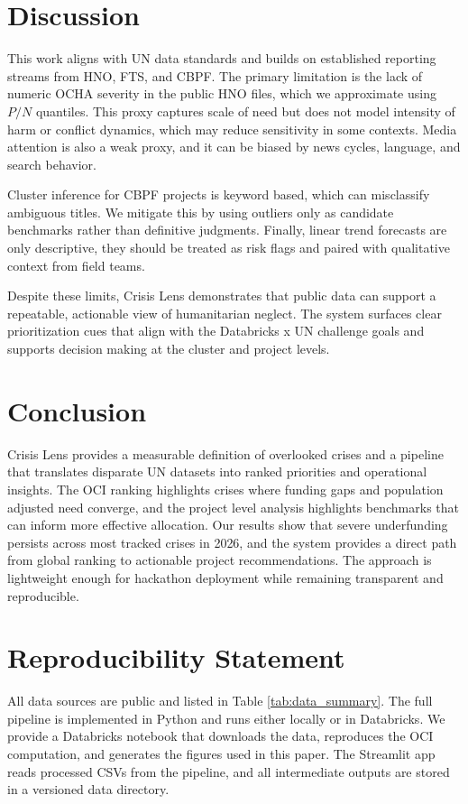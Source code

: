 \documentclass[11pt]{article}
\begin{document}
\section{Discussion}
\label{sec:discussion}
This work aligns with UN data standards and builds on established reporting streams from HNO, FTS, and CBPF. The primary limitation is the lack of numeric OCHA severity in the public HNO files, which we approximate using $P/N$ quantiles. This proxy captures scale of need but does not model intensity of harm or conflict dynamics, which may reduce sensitivity in some contexts. Media attention is also a weak proxy, and it can be biased by news cycles, language, and search behavior.

Cluster inference for CBPF projects is keyword based, which can misclassify ambiguous titles. We mitigate this by using outliers only as candidate benchmarks rather than definitive judgments. Finally, linear trend forecasts are only descriptive, they should be treated as risk flags and paired with qualitative context from field teams.

Despite these limits, Crisis Lens demonstrates that public data can support a repeatable, actionable view of humanitarian neglect. The system surfaces clear prioritization cues that align with the Databricks x UN challenge goals and supports decision making at the cluster and project levels.

\section{Conclusion}
Crisis Lens provides a measurable definition of overlooked crises and a pipeline that translates disparate UN datasets into ranked priorities and operational insights. The OCI ranking highlights crises where funding gaps and population adjusted need converge, and the project level analysis highlights benchmarks that can inform more effective allocation. Our results show that severe underfunding persists across most tracked crises in 2026, and the system provides a direct path from global ranking to actionable project recommendations. The approach is lightweight enough for hackathon deployment while remaining transparent and reproducible.

\section*{Reproducibility Statement}
All data sources are public and listed in Table \ref{tab:data_summary}. The full pipeline is implemented in Python and runs either locally or in Databricks. We provide a Databricks notebook that downloads the data, reproduces the OCI computation, and generates the figures used in this paper. The Streamlit app reads processed CSVs from the pipeline, and all intermediate outputs are stored in a versioned data directory.
\end{document}
